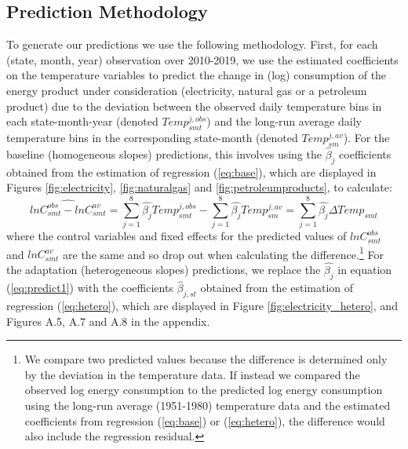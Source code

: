 \documentclass[11pt]{article}
\begin{document}
\subsection{Prediction Methodology}

To generate our predictions we use the following methodology. First, for each (state, month, year) observation over 2010-2019, we use the estimated coefficients on the temperature variables to predict the change in (log) consumption of the energy product under consideration (electricity, natural gas or a petroleum product) due to the deviation between the observed daily temperature bins in each state-month-year (denoted $Temp_{smt}^{j,obs}$) and the long-run average daily temperature bins in the corresponding state-month (denoted $Temp_{sm}^{j,av}$). For the baseline (homogeneous slopes) predictions, this involves using the $\hat\beta_{j}$ coefficients obtained from the estimation of regression (\ref{eq:base}), which are displayed in Figures \ref{fig:electricity}, \ref{fig:naturalgas} and \ref{fig:petroleumproducts}, to calculate:
\begin{equation}
\widehat{lnC_{smt}^{obs}-lnC_{smt}^{av}} = \sum_{j=1}^{8} \hat{\beta_{j}} Temp_{smt}^{j,obs} - \sum_{j=1}^{8} \hat{\beta_{j}} Temp_{sm}^{j,av} = \sum_{j=1}^{8} \hat{\beta_{j}}\Delta Temp_{smt} \label{eq:predict1}%
\end{equation} 
where the control variables and fixed effects for the predicted values of $lnC_{smt}^{obs}$ and $lnC_{smt}^{av}$ are the same and so drop out when calculating the difference.\footnote{ We compare two predicted values because the difference is determined only by the deviation in the temperature data. If instead we compared the observed log energy consumption to the predicted log energy consumption using the long-run average (1951-1980) temperature data and the estimated coefficients from regression (\ref{eq:base}) or (\ref{eq:hetero}), the difference would also include the regression residual.}  %
For the adaptation (heterogeneous slopes) predictions, we replace the $\hat{\beta_{j}}$ in equation (\ref{eq:predict1}) with the coefficients $\hat\beta_{j,st}$ obtained from the estimation of regression (\ref{eq:hetero}), which are displayed in Figure \ref{fig:electricity_hetero}, and Figures A.5, A.7 and A.8 in the appendix.
\end{document}

